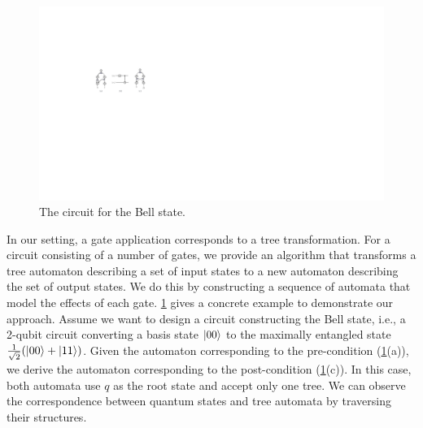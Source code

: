 %
\begin{figure}
\includegraphics{Figures/Circuits/Bells}
\caption{The circuit for the Bell state.
  }
\label{Bells:fig}
\end{figure}
%
In our setting, a gate application corresponds to a tree transformation.
%
For a circuit consisting of a number of gates, we provide an algorithm that transforms a tree automaton describing a set of input states to a new automaton describing the set of output states.
%
We do this by constructing a sequence of automata that model the effects of each gate.
%
\cref{Bells:fig} gives a concrete example to demonstrate our approach.
Assume we want to design a circuit constructing the Bell state, i.e., a 2-qubit circuit converting a basis state $|00\rangle$ to the maximally entangled state $\frac{1}{\sqrt{2}}(|00\rangle + |11\rangle)$.
%
Given the automaton corresponding to the pre-condition (\cref{Bells:fig}(a)), we derive the automaton corresponding to the post-condition (\cref{Bells:fig}(c)).
%
In this case, both automata use $q$ as the root state and accept only one tree.
%
We can observe the correspondence between quantum states and tree automata by traversing their structures.

%
